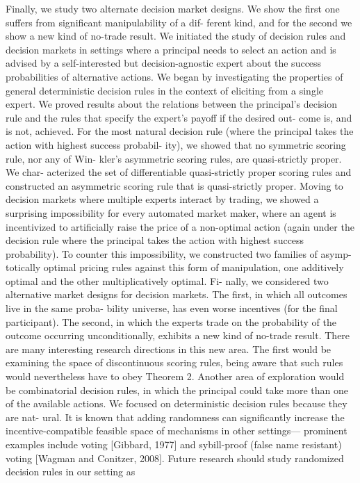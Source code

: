 {Finally, we study two alternate decision market designs. We show the first one suffers from significant manipulability of a dif- ferent kind, and for the second we show a new kind of no-trade result. 	
We initiated the study of decision rules and decision markets in settings where a principal needs to select an action and is advised by a self-interested but decision-agnostic expert about the success probabilities of alternative actions.
We began by investigating the properties of general deterministic decision rules in the context of eliciting from a single expert. We proved results about the relations between the principal’s decision rule and the rules that specify the expert’s payoff if the desired out- come is, and is not, achieved. For the most natural decision rule (where the principal takes the action with highest success probabil- ity), we showed that no symmetric scoring rule, nor any of Win- kler’s asymmetric scoring rules, are quasi-strictly proper. We char- acterized the set of differentiable quasi-strictly proper scoring rules and constructed an asymmetric scoring rule that is quasi-strictly proper.
Moving to decision markets where multiple experts interact by trading, we showed a surprising impossibility for every automated market maker, where an agent is incentivized to artificially raise the price of a non-optimal action (again under the decision rule where the principal takes the action with highest success probability). To counter this impossibility, we constructed two families of asymp- totically optimal pricing rules against this form of manipulation, one additively optimal and the other multiplicatively optimal. Fi- nally, we considered two alternative market designs for decision markets. The first, in which all outcomes live in the same proba- bility universe, has even worse incentives (for the final participant). The second, in which the experts trade on the probability of the outcome occurring unconditionally, exhibits a new kind of no-trade result.
There are many interesting research directions in this new area.
The first would be examining the space of discontinuous scoring rules, being aware that such rules would nevertheless have to obey Theorem 2. Another area of exploration would be combinatorial decision rules, in which the principal could take more than one of the available actions.
We focused on deterministic decision rules because they are nat-
ural. It is known that adding randomness can significantly increase
the incentive-compatible feasible space of mechanisms in other settings— prominent examples include voting [Gibbard, 1977] and sybill-proof (false name resistant) voting [Wagman and Conitzer, 2008]. Future research should study randomized decision rules in our setting as
}
